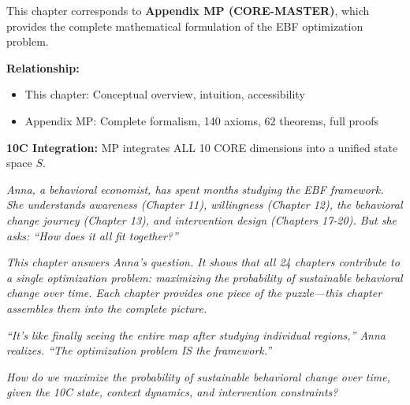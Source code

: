 \begin{tcolorbox}[colback=purple!5!white,colframe=purple!75!black,
    title=\textbf{CORE Connection: MP (CORE-MASTER)}]

This chapter corresponds to \textbf{Appendix MP (CORE-MASTER)}, which provides the complete mathematical formulation of the EBF optimization problem.

\textbf{Relationship:}
\begin{itemize}[noitemsep]
    \item This chapter: Conceptual overview, intuition, accessibility
    \item Appendix MP: Complete formalism, 140 axioms, 62 theorems, full proofs
\end{itemize}

\textbf{10C Integration:} MP integrates ALL 10 CORE dimensions into a unified state space $S$.

\end{tcolorbox}

\begin{tcolorbox}[colback=yellow!5!white,colframe=yellow!75!black,
    title=\textbf{Intuition: Anna's Journey to the Complete Picture}]

\textit{Anna, a behavioral economist, has spent months studying the EBF framework. She understands awareness (Chapter 11), willingness (Chapter 12), the behavioral change journey (Chapter 13), and intervention design (Chapters 17-20). But she asks: ``How does it all fit together?''}

\textit{This chapter answers Anna's question. It shows that all 24 chapters contribute to a single optimization problem: maximizing the probability of sustainable behavioral change over time. Each chapter provides one piece of the puzzle---this chapter assembles them into the complete picture.}

\textit{``It's like finally seeing the entire map after studying individual regions,'' Anna realizes. ``The optimization problem IS the framework.''}

\end{tcolorbox}

\begin{tcolorbox}[colback=red!5!white,colframe=red!75!black,
    title=\textbf{Central Question}]
\begin{center}
\Large\textit{How do we maximize the probability of sustainable behavioral change over time, given the 10C state, context dynamics, and intervention constraints?}
\end{center}
\end{tcolorbox}

